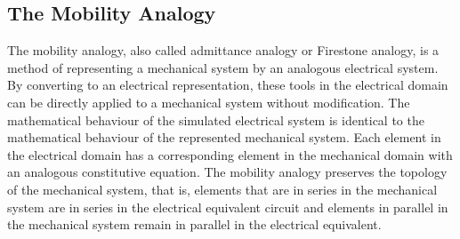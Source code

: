 \documentclass[%
 aip,
 amsmath,amssymb,
 reprint, floatfix%
]{revtex4-1}
\begin{document}
    \subsection{The Mobility Analogy}
    The mobility analogy, also called admittance analogy or Firestone analogy, is a method of representing a mechanical system by an analogous electrical system. By converting to an electrical representation, these tools in the electrical domain can be directly applied to a mechanical system without modification. The mathematical behaviour of the simulated electrical system is identical to the mathematical behaviour of the represented mechanical system. Each element in the electrical domain has a corresponding element in the mechanical domain with an analogous constitutive equation. The mobility analogy preserves the topology of the mechanical system, that is, elements that are in series in the mechanical system are in series in the electrical equivalent circuit and elements in parallel in the mechanical system remain in parallel in the electrical equivalent.
\end{document}
